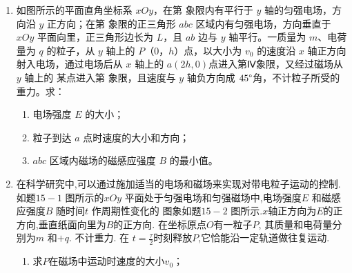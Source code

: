 \begin{enumerate}
\item 
{}
如图所示的平面直角坐标系 $ xOy $，在第  象限内有平行于 $ y $ 轴的匀强电场，方向沿 $ y $ 正方向；在第
  象限的正三角形 $ abc $ 区域内有匀强电场，方向垂直于 $ xOy $ 平面向里，正三角形边长为 $ L $，且 $ ab $
边与 $ y $ 轴平行。一质量为 $ m $、电荷量为 $ q $ 的粒子，从 $ y $ 轴上的 $ P $（$ 0 $，$ h $）点，以大小为 $ v_{0} $ 的速度沿
$ x $ 轴正方向射入电场，通过电场后从 $ x $ 轴上的 $ a ( 2h , 0) $点进入第Ⅳ象限，又经过磁场从 $ y $ 轴上的
某点进入第  象限，且速度与 $ y $ 轴负方向成 $ 45 \degree $角，不计粒子所受的重力。求：
\begin{enumerate}
	\item
电场强度 $ E $ 的大小；



\item 
粒子到达 $ a $ 点时速度的大小和方向；


\item 
$ abc $ 区域内磁场的磁感应强度 $ B $ 的最小值。

	
\end{enumerate}
\begin{figure}[h!]
	\flushright
	
\end{figure}




\item 
在科学研究中,可以通过施加适当的电场和磁场来实现对带电粒子运动的控制. 如题$ 15-1 $
图所示的$ xOy $ 平面处于匀强电场和匀强磁场中,电场强度$ E $ 和磁感应强度$ B $ 随时间$ t $ 作周期性变化的
图象如题$ 15-2 $ 图所示.$ x $轴正方向为$ E $的正方向,垂直纸面向里为$ B $的正方向. 在坐标原点$ O $有一粒子$ P $,
其质量和电荷量分别为$ m $ 和$ +q $. 不计重力. 在 $ t=\frac{\tau}{2} $时刻释放$ P $,它恰能沿一定轨道做往复运动.
\begin{enumerate}
	\item
求$ P $在磁场中运动时速度的大小$ v_{0} $；




\end{enumerate}
\end{enumerate}
